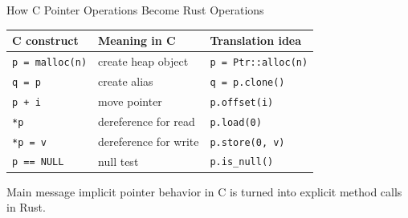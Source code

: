 \documentclass[aspectratio=169,11pt,professionalfonts]{beamer}
\begin{document}
\begin{frame}{How C Pointer Operations Become Rust Operations}
  \small
  \begin{tabular}{>{\raggedright\arraybackslash}p{} >{\raggedright\arraybackslash}p{} >{\raggedright\arraybackslash}p{}}
    \toprule
    \textbf{C construct} & \textbf{Meaning in C} & \textbf{Translation idea} \\
    \midrule
    \texttt{p = malloc(n)} & create heap object & \texttt{p = Ptr::alloc(n)} \\
    \texttt{q = p} & create alias & \texttt{q = p.clone()} \\
    \texttt{p + i} & move pointer & \texttt{p.offset(i)} \\
    \texttt{*p} & dereference for read & \texttt{p.load(0)} \\
    \texttt{*p = v} & dereference for write & \texttt{p.store(0, v)} \\
    \texttt{p == NULL} & null test & \texttt{p.is\_null()} \\
    \bottomrule
  \end{tabular}

  \vspace{0.7em}
  \begin{block}{Main message}
    implicit pointer behavior in C is turned into explicit method calls in Rust.
  \end{block}
\end{frame}
\end{document}
